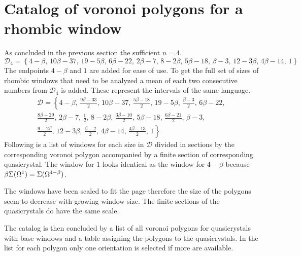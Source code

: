\documentclass[text.tex]{subfiles}
\begin{document}
\section{Catalog of voronoi polygons for a rhombic window}
As concluded in the previous section the sufficient $n=4$. 
$$\mathcal{D}_4 = \left\{4-\beta,\, 10\beta-37,\, 19-5\beta,\, 6\beta-22,\, 2\beta-7,\, 8-2\beta,\, 5\beta-18,\, \beta-3,\, 12-3\beta,\, 4\beta-14,\, 1\right\}$$
The endpoints $4-\beta$ and $1$ are added for ease of use. To get the full set of sizes of rhombic windows that need to be analyzed a mean of each two consecutive numbers from $\mathcal{D}_4$ is added. These represent the intervals of the same language. 
\begin{multline*}
\mathcal{D} = \left\{4-\beta,\, \frac{9\beta-33}{2},\, 10\beta-37,\, \frac{5\beta-18}{2},\, 19-5\beta,\, \frac{\beta-3}{2},\, 6\beta-22,\, \right. \\
\frac{8\beta-29}{2},\, 2\beta-7,\, \frac{1}{2},\, 8-2\beta,\, \frac{3\beta-10}{2},\,  5\beta-18,\, \frac{6\beta-21}{2},\, \beta-3,\, \\
\left. \frac{9-2\beta}{2},\, 12-3\beta,\, \frac{\beta-2}{2},\, 4\beta-14,\, \frac{4\beta-13}{2},\, 1\right\}
\end{multline*}
Following is a list of windows for each size in $\mathcal{D}$ divided in sections by the corresponding voronoi polygon accompanied by a finite section of corresponding quasicrystal. The window for $1$ looks identical as the window for $4-\beta$ because $\beta\Sigma(\Omega^1)=\Sigma(\Omega^{4-\beta})$.

The windows have been scaled to fit the page therefore the size of the polygons seem to decrease with growing window size. The finite sections of the quasicrystals do have the same scale.

The catalog is then concluded by a list of all voronoi polygons for quasicrystals with base windows and a table assigning the polygons to the quasicrystals. In the list for each polygon only one orientation is selected if more are available. 
\end{document}

